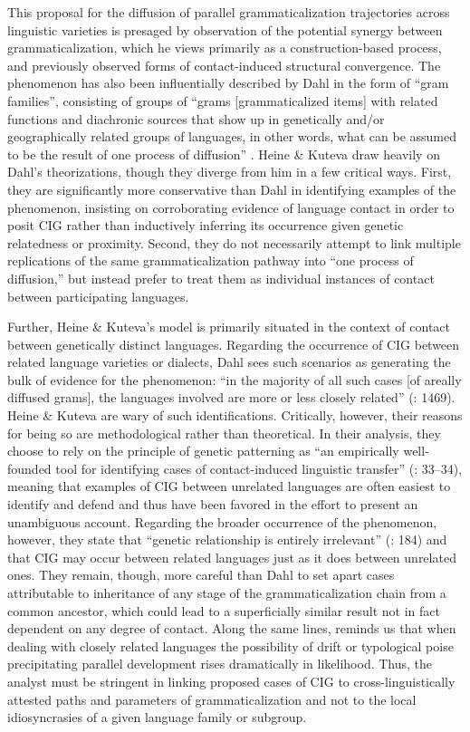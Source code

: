 \documentclass[output=paper]{langsci/langscibook}
\begin{document}
This proposal for the diffusion of parallel grammaticalization trajectories across linguistic varieties is presaged by  observation of the potential synergy between grammaticalization, which he views primarily as a construction-based process, and previously observed forms of contact-induced structural convergence. The phenomenon has also been influentially described by Dahl in the form of “gram families”, consisting of groups of “grams [grammaticalized items] with related functions and diachronic sources that show up in genetically and/or geographically related groups of languages, in other words, what can be assumed to be the result of one process of diffusion” \citep[1469]{Dahl2001}. Heine \& Kuteva draw heavily on Dahl’s theorizations, though they diverge from him in a few critical ways. First, they are significantly more conservative than Dahl in identifying examples of the phenomenon, insisting on corroborating evidence of language contact in order to posit CIG rather than inductively inferring its occurrence given genetic relatedness or proximity. Second, they do not necessarily attempt to link multiple replications of the same grammaticalization pathway into “one process of diffusion,” but instead prefer to treat them as individual instances of contact between participating languages. 

Further, Heine \& Kuteva’s model is primarily situated in the context of contact between genetically distinct languages. Regarding the occurrence of CIG between related language varieties or dialects, Dahl sees such scenarios as generating the bulk of evidence for the phenomenon: “in the majority of all such cases [of areally diffused grams], the languages involved are more or less closely related” (\citeyear{Dahl2001}: 1469). Heine \& Kuteva are wary of such identifications. Critically, however, their reasons for being so are methodological rather than theoretical. In their analysis, they choose to rely on the principle of genetic patterning as “an empirically well-founded tool for identifying cases of contact-induced linguistic transfer” (\citeyear{HeineKuteva2005}: 33--34), meaning that examples of CIG between unrelated languages are often easiest to identify and defend and thus have been favored in the effort to present an unambiguous account. Regarding the broader occurrence of the phenomenon, however, they state that “genetic relationship is entirely irrelevant” (\citeyear{HeineKuteva2005}: 184) and that CIG may occur between related languages just as it does between unrelated ones. They remain, though, more careful than Dahl to set apart cases attributable to inheritance of any stage of the grammaticalization chain from a common ancestor, which could lead to a superficially similar result not in fact dependent on any degree of contact. Along the same lines, \citet{Law2014} reminds us that when dealing with closely related languages the possibility of drift or typological poise precipitating parallel development rises dramatically in likelihood. Thus, the analyst must be stringent in linking proposed cases of CIG to cross-linguistically attested paths and parameters of grammaticalization and not to the local idiosyncrasies of a given language family or subgroup.
\end{document}
